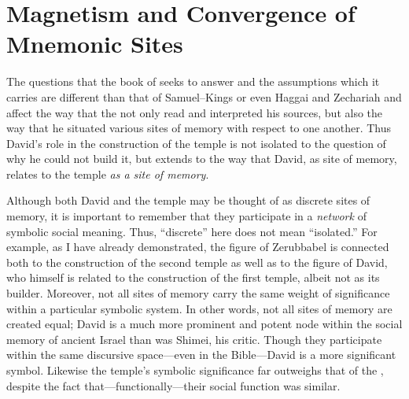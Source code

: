 \section{Magnetism and Convergence of Mnemonic Sites}

The questions that the book of \chronicles seeks to answer and the assumptions which it carries are different than that of Samuel--Kings or even Haggai and Zechariah and affect the way that the \chronicler not only read and interpreted his sources, but also the way that he situated various sites of memory with respect to one another. Thus David's role in the construction of the temple is not isolated to the question of why he could not build it, but extends to the way that David, as site of memory, relates to the temple \emph{as a site of memory}.

Although both David and the temple may be thought of as discrete sites of memory, it is important to remember that they participate in a \emph{network} of symbolic social meaning. Thus, ``discrete'' here does not mean ``isolated.'' For example, as I have already demonstrated, the figure of Zerubbabel is connected both to the construction of the second temple as well as to the figure of David, who himself is related to the construction of the first temple, albeit not as its builder. Moreover, not all sites of memory carry the same weight of significance within a particular symbolic system. In other words, not all sites of memory are created equal; David is a much more prominent and potent node within the social memory of ancient Israel than was Shimei, his critic. Though they participate within the same discursive space---even in the Bible---David is a more significant symbol. Likewise the temple's symbolic significance far outweighs that of the , despite the fact that---functionally---their social function was similar.

